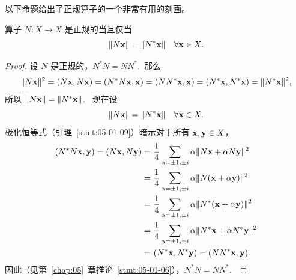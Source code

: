 以下命题给出了正规算子的一个非常有用的刻画。

\begin{proposition}\label{stmt:06-02-05}
算子 $N: X \to X$ 是正规的当且仅当
$$\|N\mathbf{x}\| = \|N^*\mathbf{x}\| \quad \forall \mathbf{x} \in X.$$
\end{proposition}

\begin{proof}设 $N$ 是正规的，$N^*N = NN^*$.~那么
$$\|N\mathbf{x}\|^2 = (N\mathbf{x}, N\mathbf{x}) = (N^*N\mathbf{x}, \mathbf{x}) = (NN^*\mathbf{x}, \mathbf{x}) = (N^*\mathbf{x}, N^*\mathbf{x}) = \|N^*\mathbf{x}\|^2,$$
所以 $\|N\mathbf{x}\| = \|N^*\mathbf{x}\|$.~
现在设
$$\|N\mathbf{x}\| = \|N^*\mathbf{x}\| \quad \forall \mathbf{x} \in X.$$
极化恒等式（引理~\ref{stmt:05-01-09}）暗示对于所有 $\mathbf{x}, \mathbf{y} \in X$，
\begin{equation} \notag
\begin{split}
(N^*N\mathbf{x}, \mathbf{y}) = (N\mathbf{x}, N\mathbf{y}) =&\   \frac{1}{4} \sum_{\alpha = \pm 1, \pm i} \alpha \|N\mathbf{x} + \alpha N\mathbf{y}\|^2  \\
=&\ \frac{1}{4} \sum_{\alpha = \pm 1, \pm i} \alpha \|N(\mathbf{x} + \alpha \mathbf{y})\|^2   \\
=&\  \frac{1}{4} \sum_{\alpha = \pm 1, \pm i} \alpha \|N^*(\mathbf{x} + \alpha \mathbf{y})\|^2  \\
=&\  \frac{1}{4} \sum_{\alpha = \pm 1, \pm i} \alpha \|N^* \mathbf{x} + \alpha N^* \mathbf{y}\|^2  \\
=&\ (N^*\mathbf{x}, N^*\mathbf{y}) = (NN^*\mathbf{x}, \mathbf{y}).
 \end{split}
\end{equation}
因此（见第~\ref{chap:05}~章推论~\ref{stmt:05-01-06}），$N^*N = NN^*$.~\end{proof}

